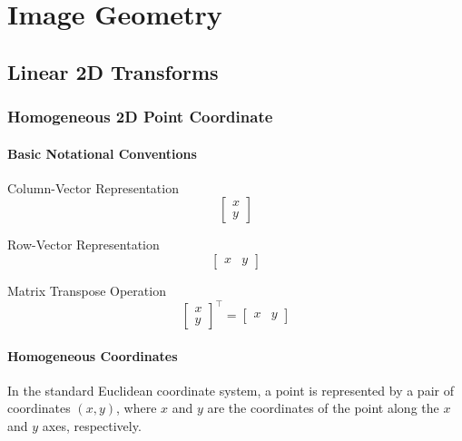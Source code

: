 \chapter{Image Geometry}

\section{Linear 2D Transforms}

\subsection{Homogeneous 2D Point Coordinate}

\subsubsection{Basic Notational Conventions}

\begin{listu}
    \item Column-Vector Representation \[
        \begin{bmatrix}
            x \\
            y 
        \end{bmatrix}
    \]

    \item Row-Vector Representation \[
        \begin{bmatrix}
            x & y
        \end{bmatrix}
    \]

    \item Matrix Transpose Operation \[
        \begin{bmatrix}
            x \\
            y
        \end{bmatrix}^\top = \begin{bmatrix}
            x & y
        \end{bmatrix}
    \]
\end{listu}

\subsubsection{Homogeneous Coordinates}

In the standard Euclidean coordinate system, a point is represented by a pair of coordinates $(x, y)$, where $x$ and $y$ are the coordinates of the point along the $x$ and $y$ axes, respectively. 

